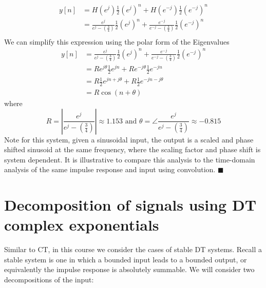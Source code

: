\begin{example}
   \begin{align*}
     y[n] &= H\left(e^{j}\right)\frac{1}{2}\left(e^{j}\right)^n + H\left(e^{-j}\right)\frac{1}{2}\left(e^{-j}\right)^n\\
     &= \frac{e^{j}}{e^{j}-\left(\frac{3}{4}\right)}\frac{1}{2}\left(e^{j}\right)^n + \frac{e^{-j}}{e^{-j}-\left(\frac{3}{4}\right)}\frac{1}{2}\left(e^{-j}\right)^n\\
   \end{align*}
   We can simplify this expression using the polar form of the Eigenvalues
   \begin{align*}
     y[n] &= \frac{e^{j}}{e^{j}-\left(\frac{3}{4}\right)}\frac{1}{2}\left(e^{j}\right)^n + \frac{e^{-j}}{e^{-j}-\left(\frac{3}{4}\right)}\frac{1}{2}\left(e^{-j}\right)^n\\
     &= Re^{j\theta} \frac{1}{2}e^{jn} + Re^{-j\theta} \frac{1}{2}e^{-jn}\\
     &= R \frac{1}{2}e^{jn + j\theta} + R \frac{1}{2}e^{-jn -j\theta}\\
     &= R\cos(n + \theta)
   \end{align*}
   where
   \[
   R = \left|\frac{e^{j}}{e^{j}-\left(\frac{3}{4}\right)}\right| \approx 1.153  \mbox{ and } \theta = \angle{\frac{e^{j}}{e^{j}-\left(\frac{3}{4}\right)}} \approx -0.815
   \]
   Note for this system, given a sinusoidal input, the output is a scaled and phase shifted sinusoid at the same frequency, where the scaling factor and phase shift is system dependent. It is illustrative to compare this analysis to the time-domain analysis of the same impulse response and input using convolution.
   $\blacksquare$
\end{example}

\section{Decomposition of signals using DT complex exponentials}

Similar to CT, in this course we consider the cases of stable DT systems. Recall a stable system is one in which a bounded input leads to a bounded output, or equivalently the impulse response is absolutely summable. We will consider two decompositions of the input:

